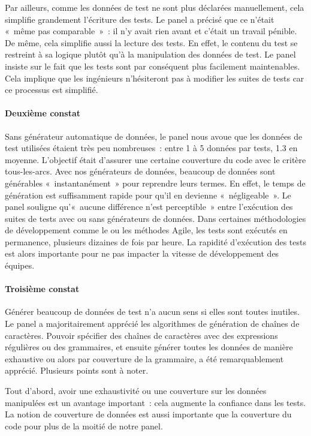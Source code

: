 Par ailleurs, comme les données de test ne sont plus déclarées manuellement,
cela simplifie grandement l'écriture des tests. Le panel a précisé que ce
n'était «~même pas comparable~»~: il n'y avait rien avant et c'était un travail
pénible. De même, cela simplifie aussi la lecture des tests. En effet, le
contenu du test se restreint à sa logique plutôt qu'à la manipulation des
données de test. Le panel insiste sur le fait que les tests sont par conséquent
plus facilement maintenables. Cela implique que les ingénieurs n'hésiteront pas
à modifier les suites de tests car ce processus est simplifié.

\paragraph{Deuxième constat} Sans générateur automatique de données, le panel
nous avoue que les données de test utilisées étaient très peu nombreuses~:
entre 1 à 5 données par tests, 1.3 en moyenne. L'objectif était d'assurer une
certaine couverture du code avec le critère tous-les-arcs. Avec nos générateurs
de données, beaucoup de données sont générables «~instantanément~» pour
reprendre leurs termes. En effet, le temps de génération est suffisamment rapide
pour qu'il en devienne «~négligeable~». Le panel souligne qu'«~aucune différence
n'est perceptible~» entre l'exécution des suites de tests avec ou sans
générateurs de données. Dans certaines méthodologies de développement comme le
 ou les méthodes Agile, les tests sont
exécutés en permanence, plusieurs dizaines de fois par heure. La rapidité
d'exécution des tests est alors importante pour ne pas impacter la vitesse de
développement des équipes.

\paragraph{Troisième constat} Générer beaucoup de données de test n'a aucun
sens si elles sont toutes inutiles. Le panel a majoritairement apprécié les
algorithmes de génération de chaînes de caractères. Pouvoir spécifier des
chaînes de caractères avec des expressions régulières ou des grammaires, et
ensuite générer toutes les données de manière exhaustive ou alors par couverture
de la grammaire, a été remarquablement apprécié. Plusieurs points sont à noter.

Tout d'abord, avoir une exhaustivité ou une couverture sur les données
manipulées est un avantage important~: cela augmente la confiance dans les
tests. La notion de couverture de données est aussi importante que la couverture
du code pour plus de la moitié de notre panel.


